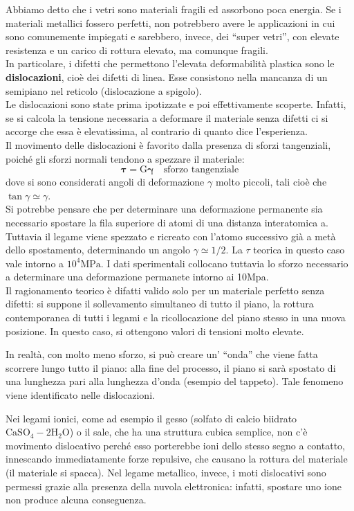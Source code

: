 Abbiamo detto che i vetri sono materiali fragili ed assorbono poca energia.
Se i materiali metallici fossero perfetti, non potrebbero avere le applicazioni in cui sono comunemente impiegati e sarebbero, invece, dei “super vetri”, con elevate resistenza e un carico di rottura elevato, ma comunque fragili.\\
In particolare, i difetti che permettono l’elevata deformabilità plastica sono le \textbf{dislocazioni}, cioè dei difetti di linea. Esse consistono nella mancanza di un semipiano nel reticolo (dislocazione a spigolo).\\
Le dislocazioni sono state prima ipotizzate e poi effettivamente scoperte. Infatti, se si calcola la tensione necessaria a deformare il materiale senza difetti ci si accorge che essa è elevatissima, al contrario di quanto dice l’esperienza.\\
Il movimento delle dislocazioni è favorito dalla presenza di sforzi tangenziali, poiché gli sforzi normali tendono a spezzare il materiale:
\begin{equation*}
    \boldsymbol{\tau = \mathrm{G}\gamma} \quad\text{sforzo tangenziale}
\end{equation*}
dove si sono considerati angoli di deformazione $\gamma$ molto piccoli, tali cioè che $\tan\gamma\simeq\gamma$.\\
Si potrebbe pensare che per determinare una deformazione permanente sia necessario spostare la fila superiore di atomi di una distanza interatomica a. Tuttavia il legame viene spezzato e ricreato con l'atomo successivo già a metà dello spostamento, determinando un angolo $\gamma\simeq1/2$. La $\tau$ teorica in questo caso vale intorno a $10^4\text{MPa}$. I dati sperimentali collocano tuttavia lo sforzo necessario a determinare una deformazione permanete intorno ai 10Mpa.\\
Il ragionamento teorico è difatti valido solo per un materiale perfetto senza difetti: si suppone il sollevamento simultaneo di tutto il piano, la rottura contemporanea di tutti i legami e la ricollocazione del piano stesso in una nuova posizione. In questo caso, si ottengono valori di tensioni molto elevate.

In realtà, con molto meno sforzo, si può creare un’ “onda” che viene fatta scorrere lungo tutto il piano: alla fine del processo, il piano si sarà spostato di una lunghezza pari alla lunghezza d’onda (esempio del tappeto). Tale fenomeno viene identificato nelle dislocazioni.

Nei legami ionici, come ad esempio il gesso (solfato di calcio biidrato $\mathrm{CaSO_4-2H_2O}$) o il sale, che ha una struttura cubica semplice, non c’è movimento dislocativo perché esso porterebbe ioni dello stesso segno a contatto, innescando immediatamente forze repulsive, che causano la rottura del materiale (il materiale si spacca).
Nel legame metallico, invece, i moti dislocativi sono permessi grazie alla presenza della nuvola elettronica: infatti, spostare uno ione non produce alcuna conseguenza.

